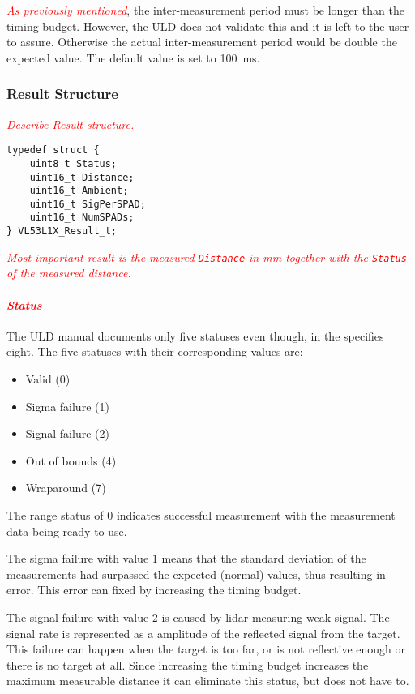 \documentclass[
  digital,     %
  oneside,     %
  nosansbold,  %
  nocolorbold, %
  lof,         %
  lot,         %
]{fithesis4}
\newcommand{\TODO}[1]{\textcolor{red}{\textit{#1}}}
\begin{document}
\TODO{As previously mentioned}, the inter-measurement period must be longer than the timing budget. However, the ULD does not validate this and it is left to the user to assure. Otherwise the actual inter-measurement period would be double the expected value. The default value is set to \qty{100}{\milli\second}.

\subsubsection{ Result Structure }
\TODO{Describe Result structure.}

\begin{lstlisting}
typedef struct {
    uint8_t Status;
    uint16_t Distance;
    uint16_t Ambient;
    uint16_t SigPerSPAD;
    uint16_t NumSPADs;
} VL53L1X_Result_t;
\end{lstlisting}

\TODO{
Most important result is the measured \lstinline|Distance| in \unit{\milli\metre} together with the \lstinline|Status| of the measured distance.
}

\paragraph{\TODO{Status}}

The ULD manual \cite{um2510} documents only five statuses even though, in the \cite{vl53l1x} specifies eight. The five statuses with their corresponding values are:
\begin{itemize}
    \item Valid (0)
    \item Sigma failure (1)
    \item Signal failure (2)
    \item Out of bounds (4)
    \item Wraparound (7)
\end{itemize}

The range status of $0$ indicates successful measurement with the measurement data being ready to use.

The sigma failure with value $1$ means that the standard deviation of the measurements had surpassed the expected (normal) values, thus resulting in error. This error can fixed by increasing the timing budget.

The signal failure with value $2$ is caused by \acrshort{lidar} measuring weak signal. The signal rate is represented as a amplitude of the reflected signal from the target. This failure can happen when the target is too far, or is not reflective enough or there is no target at all. Since increasing the timing budget increases the maximum measurable distance it can eliminate this status, but does not have to.
\end{document}
